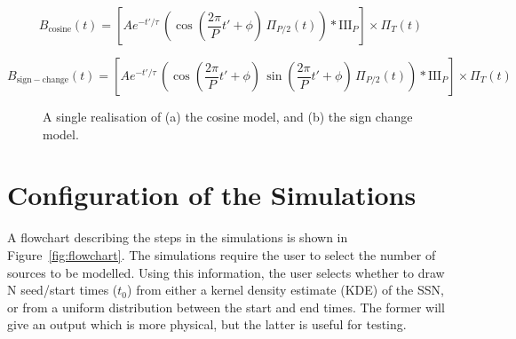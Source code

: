 \begin{equation}
B_{\mathrm{cosine}}(t) = \left[ A e^{-t'/\tau} \, \left( \cos{\left(\frac{2\pi}{P}t' + \phi\right)} \, \Pi_{P/2}(t) \right) * \mathrm{III}_{P} \right] \times \Pi_{T}(t)
\label{eq:cosine_model}
\end{equation}


\begin{equation}
B_{\mathrm{sign-change}}(t) = \left[ A e^{-t'/\tau} \, \left( \cos{\left(\frac{2\pi}{P}t' + \phi\right)} \, \sin{\left(\frac{2\pi}{P}t' + \phi\right)} \, \Pi_{P/2}(t) \right) * \mathrm{III}_{P} \right] \times \Pi_{T}(t)
\label{eq:sgn_cng_model}
\end{equation}


\begin{figure}[ht!]
	\centering
	\qquad
	\caption{A single realisation of (a) the cosine model, and (b) the sign change model.}  
	\label{fig:artificial_TS}
\end{figure}


\section{Configuration of the Simulations}

A flowchart describing the steps in the simulations is shown in Figure~\ref{fig:flowchart}. The simulations require the user to select the number of sources to be modelled. Using this information, the user selects whether to draw N seed/start times ($t_0$) from either a kernel density estimate (KDE) of the SSN, or from a uniform distribution between the start and end times. The former will give an output which is more physical, but the latter is useful for testing.


